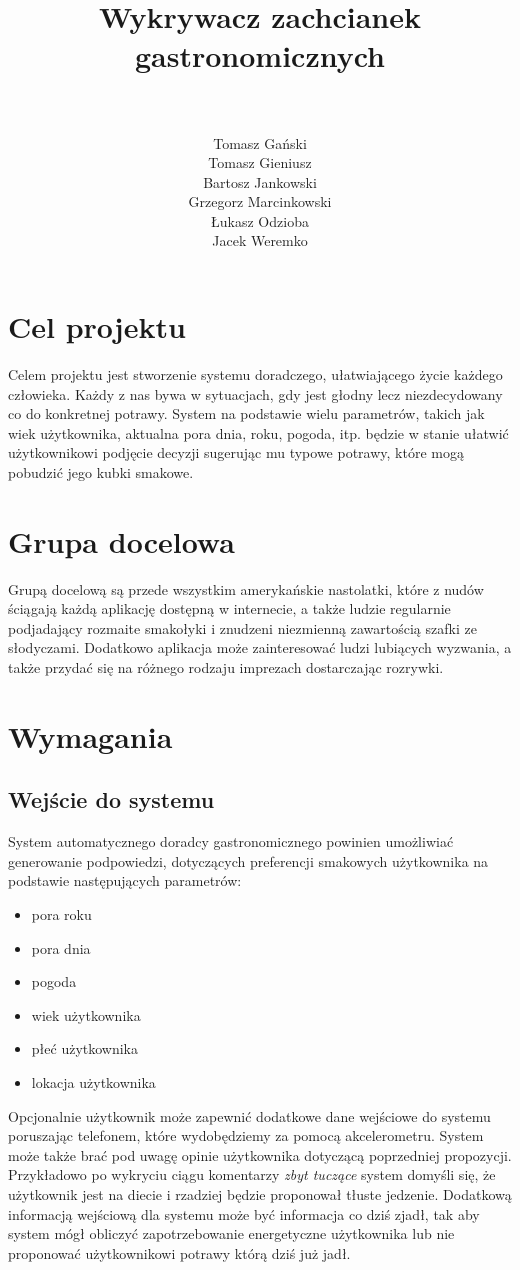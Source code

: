 \documentclass[a4paper,twoside,11pt]{article}
\author{\\ ~ \\ Tomasz Gański \\
Tomasz Gieniusz \\
Bartosz Jankowski\\
Grzegorz Marcinkowski\\
Łukasz Odzioba\\
Jacek Weremko}
\title{\LARGE Wykrywacz zachcianek gastronomicznych}
\begin{document}


\tableofcontents

\newpage

\section{Cel projektu}
Celem projektu jest stworzenie systemu doradczego, ułatwiającego życie każdego człowieka. Każdy z nas bywa w sytuacjach, gdy jest głodny lecz niezdecydowany co do konkretnej potrawy. 
System na podstawie wielu parametrów, takich jak wiek użytkownika, aktualna pora dnia, roku, pogoda, itp. będzie w stanie ułatwić użytkownikowi podjęcie decyzji sugerując mu typowe potrawy, które mogą pobudzić jego kubki smakowe.

\section{Grupa docelowa}
Grupą docelową są przede wszystkim amerykańskie nastolatki, które z nudów ściągają każdą aplikację dostępną w internecie, a także ludzie regularnie podjadający rozmaite smakołyki i znudzeni niezmienną zawartością szafki ze słodyczami. Dodatkowo aplikacja może zainteresować ludzi lubiących wyzwania, a także przydać się na różnego rodzaju imprezach dostarczając rozrywki.

\section{Wymagania}
\subsection{Wejście do systemu}
System automatycznego doradcy gastronomicznego powinien umożliwiać generowanie podpowiedzi, dotyczących preferencji smakowych użytkownika na podstawie następujących parametrów:
\begin{itemize}
\item pora roku
\item pora dnia
\item pogoda
\item wiek użytkownika
\item płeć użytkownika
\item lokacja użytkownika
\end{itemize}
Opcjonalnie użytkownik może zapewnić dodatkowe dane wejściowe do systemu poruszając telefonem, które wydobędziemy za pomocą akcelerometru. 
System może także brać pod uwagę opinie użytkownika dotyczącą poprzedniej propozycji. Przykładowo po wykryciu ciągu komentarzy \emph{zbyt tuczące} system domyśli się, że użytkownik jest na diecie i rzadziej będzie proponował tłuste jedzenie.
Dodatkową informacją wejściową dla systemu może być informacja co dziś zjadł, tak aby system mógł obliczyć zapotrzebowanie energetyczne użytkownika lub nie proponować użytkownikowi potrawy którą dziś już jadł.
\end{document}
